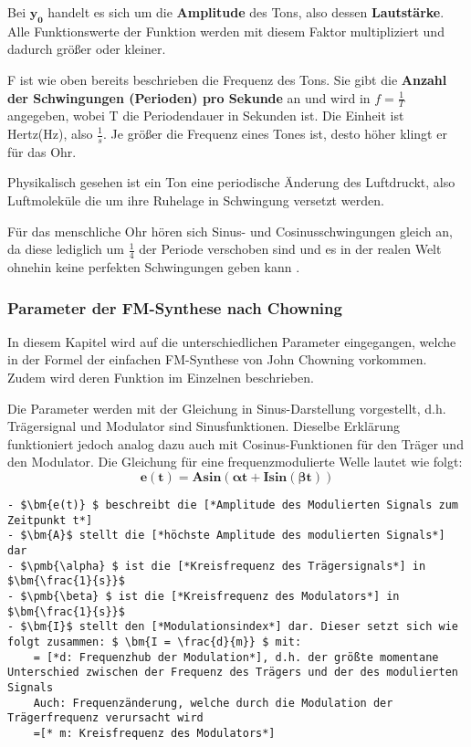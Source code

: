 Bei $\bm{y_0}$ handelt es sich um die \textbf{Amplitude} des Tons, also dessen \textbf{Lautstärke}. Alle Funktionswerte der Funktion werden mit diesem Faktor multipliziert und dadurch größer oder kleiner.

F ist wie oben bereits beschrieben die Frequenz des Tons. Sie gibt die \textbf{Anzahl der Schwingungen (Perioden) pro Sekunde} an und wird in $f=\frac{1}{T}$ angegeben, wobei T die Periodendauer in Sekunden ist. Die Einheit ist Hertz(Hz), also $\frac{1}{s}$.
Je größer die Frequenz eines Tones ist, desto höher klingt er für das Ohr.

Physikalisch gesehen ist ein Ton eine periodische Änderung des Luftdruckt, also Luftmoleküle die um ihre Ruhelage in Schwingung versetzt werden\cite[s. 111 f.]{zwicker}. 

Für das menschliche Ohr hören sich Sinus- und Cosinusschwingungen gleich an, da diese lediglich um $\frac{1}{4}$ der Periode verschoben sind und es in der realen Welt ohnehin keine perfekten Schwingungen geben kann \cite[s. 3f.]{zwicker}. 

\FloatBarrier
\subsubsection{Parameter der FM-Synthese nach Chowning}
\label{chowningparameter}

In diesem Kapitel wird auf die unterschiedlichen Parameter eingegangen, welche in der Formel der einfachen FM-Synthese von John Chowning vorkommen. Zudem wird deren Funktion im Einzelnen beschrieben.

Die Parameter werden mit der Gleichung in Sinus-Darstellung vorgestellt, d.h. Trägersignal und Modulator sind Sinusfunktionen. Dieselbe Erklärung funktioniert jedoch analog dazu auch mit Cosinus-Funktionen für den Träger und den Modulator.
Die Gleichung für eine frequenzmodulierte Welle lautet wie folgt:
\[ \bm{e(t) = A sin(\pmb{\alpha} t + I sin(\pmb{\beta} t))} \]

\begin{lstlisting}[mathescape]
- $\bm{e(t)} $ beschreibt die [*Amplitude des Modulierten Signals zum Zeitpunkt t*]
- $\bm{A}$ stellt die [*höchste Amplitude des modulierten Signals*] dar
- $\pmb{\alpha} $ ist die [*Kreisfrequenz des Trägersignals*] in $\bm{\frac{1}{s}}$
- $\pmb{\beta} $ ist die [*Kreisfrequenz des Modulators*] in $\bm{\frac{1}{s}}$
- $\bm{I}$ stellt den [*Modulationsindex*] dar. Dieser setzt sich wie folgt zusammen: $ \bm{I = \frac{d}{m}} $ mit:
	= [*d: Frequenzhub der Modulation*], d.h. der größte momentane Unterschied zwischen der Frequenz des Trägers und der des modulierten Signals
	Auch: Frequenzänderung, welche durch die Modulation der Trägerfrequenz verursacht wird
	=[* m: Kreisfrequenz des Modulators*]
\end{lstlisting} \cite{chowningPaper}

